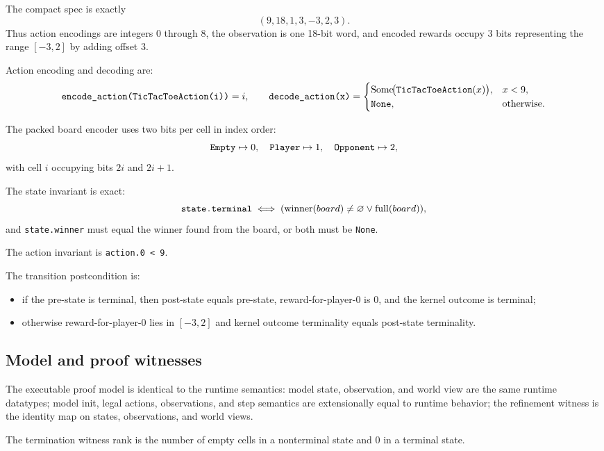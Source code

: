\documentclass[11pt]{article}
\newcommand{\code}[1]{\ifmmode\text{\texttt{#1}}\else\texttt{#1}\fi}
\begin{document}
The compact spec is exactly
\[
(9,18,1,3,-3,2,3).
\]
Thus action encodings are integers $0$ through $8$, the observation is one 18-bit word, and encoded rewards occupy 3 bits representing the range $[-3,2]$ by adding offset $3$.

Action encoding and decoding are:
\[
\code{encode\_action(TicTacToeAction(i))}=i,
\qquad
\code{decode\_action(x)}=\begin{cases}
\operatorname{Some}\!\bigl(\code{TicTacToeAction}(x)\bigr), & x<9,\\
\code{None}, & \text{otherwise}.
\end{cases}
\]

The packed board encoder uses two bits per cell in index order:
\[
\code{Empty}\mapsto 0,\quad \code{Player}\mapsto 1,\quad \code{Opponent}\mapsto 2,
\]
with cell $i$ occupying bits $2i$ and $2i+1$.

The state invariant is exact:
\[
\code{state.terminal} \iff (\operatorname{winner}(board)\neq\varnothing \lor \operatorname{full}(board)),
\]
and \code{state.winner} must equal the winner found from the board, or both must be \code{None}.

The action invariant is \code{action.0 < 9}.

The transition postcondition is:
\begin{itemize}
  \item if the pre-state is terminal, then post-state equals pre-state, reward-for-player-$0$ is $0$, and the kernel outcome is terminal;
  \item otherwise reward-for-player-$0$ lies in $[-3,2]$ and kernel outcome terminality equals post-state terminality.
\end{itemize}

\subsection{Model and proof witnesses}

The executable proof model is identical to the runtime semantics: model state, observation, and world view are the same runtime datatypes; model init, legal actions, observations, and step semantics are extensionally equal to runtime behavior; the refinement witness is the identity map on states, observations, and world views.

The termination witness rank is the number of empty cells in a nonterminal state and $0$ in a terminal state.
\end{document}
